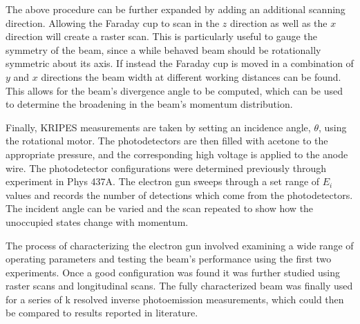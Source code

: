 The above procedure can be further expanded by adding an additional scanning direction. Allowing the Faraday cup to scan in the $z$ direction as well as the $x$ direction will create a 
raster scan. This is particularly useful to gauge the symmetry of the beam, since a while behaved beam should be rotationally symmetric about its axis. If instead the Faraday cup is 
moved in a combination of $y$ and $x$ directions the beam width at different working distances can be found. This allows for the beam's divergence angle to be computed, which can be 
used to determine the broadening in the beam's momentum distribution. 

Finally, KRIPES measurements are taken by setting an incidence angle, $\theta$, using the rotational motor. The photodetectors are then filled with acetone to the appropriate pressure, and 
the corresponding high voltage is applied to the anode wire. The photodetector configurations were determined previously through experiment in Phys 437A. 
The electron gun sweeps through a set range of $E_i$ values and records the number of detections which come from the photodetectors. 
The incident angle can be varied and the scan repeated to show how the unoccupied states change with momentum. 

The process of characterizing the electron gun involved examining a wide range of operating parameters and testing the beam's performance using the first two experiments. Once a 
good configuration was found it was further studied using raster scans and longitudinal scans. The fully characterized beam was finally used for a series of k 
resolved inverse photoemission measurements, which could then be compared to results reported in literature. 